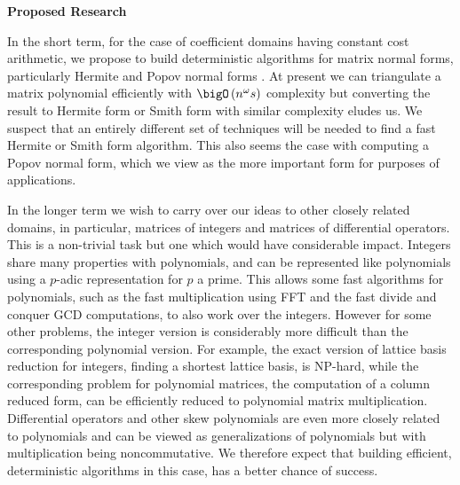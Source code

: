 \bigskip
\noindent
{\bf Proposed Research}
\bigskip

In the short term, for the case of coefficient domains having constant cost arithmetic, we propose to build deterministic algorithms for
matrix normal forms, particularly Hermite and Popov normal forms \cite{popov}. At present we can triangulate a matrix polynomial efficiently with $\bigO\left(n^{\omega}s\right)$ complexity but converting the result to Hermite form or Smith form with similar complexity eludes us.  We suspect that an entirely different set of techniques will be needed to find a fast Hermite or Smith form algorithm. This also seems the case with computing a Popov normal form, which we view as the more important form for purposes of applications. 

In the longer term we wish to carry over our ideas to other closely related domains, in particular,  matrices of integers and matrices of differential operators. This is a non-trivial task but one which would have considerable impact. Integers share many properties with polynomials, and can be represented like polynomials using a $p$-adic representation for $p$ a prime. This allows some fast algorithms for polynomials, such as the fast multiplication using FFT and the fast divide and conquer GCD computations, to also work over the integers. However for some other problems, the integer version is considerably more difficult than the corresponding polynomial version. For example, the exact version of lattice basis reduction for integers, finding a shortest lattice basis, is NP-hard, while the corresponding problem for polynomial matrices, the computation of a column reduced form, can be efficiently reduced to polynomial matrix multiplication.
Differential operators and other skew polynomials are even more closely related to polynomials and can be viewed as generalizations of polynomials but with multiplication being noncommutative. 
We therefore expect that building efficient, deterministic algorithms in this case, %
has a better chance of success.

